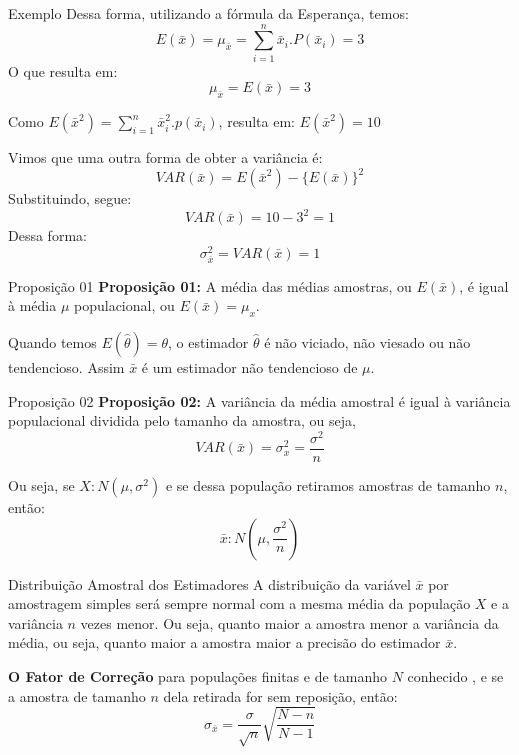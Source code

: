 \documentclass[hyperref={pdfpagelabels=false}]{beamer}
\begin{document}
\begin{frame}{Exemplo}
	Dessa forma, utilizando a fórmula da Esperança, temos: \pause
	$$E(\bar{x}) = \mu_{\bar{x}} = \displaystyle \sum_{i=1}^{n}\bar{x}_i . P(\bar{x}_i) = 3$$ \pause
	O que resulta em:
	$$\mu_{\bar{x}} = E(\bar{x}) = 3$$
	
	\pause
	Como $E(\bar{x}^2) = \displaystyle \sum_{i=1}^{n}\bar{x}_i^2 . p(\bar{x}_i)$, resulta em: $E(\bar{x}^2) =10$
	
	\pause
	Vimos que uma outra forma de obter a variância é: 
	$$VAR(\bar{x}) = E(\bar{x}^2) - \{E(\bar{x})\}^2$$
	\pause
	Substituindo, segue:
	$$VAR(\bar{x}) = 10 - 3^2 = 1$$
	\pause
	Dessa forma:
	$$\sigma_{\bar{x}}^2 = VAR(\bar{x})=1$$
\end{frame}

\begin{frame}{Proposição 01}
	\textbf{Proposição 01:}	A média das médias amostras, ou $E(\bar{x})$, é igual à média $\mu$ populacional, ou $E(\bar{x}) = \mu_x$.
	
	\pause
	Quando temos $E(\hat{\theta}) = \theta$, o estimador $\hat{\theta}$ é não viciado, não viesado ou não tendencioso. Assim $\bar{x}$ é um estimador não tendencioso de $\mu$.
\end{frame}

\begin{frame}{Proposição 02}
	\textbf{Proposição 02:}	A variância da média amostral é igual à variância populacional dividida pelo tamanho da amostra, ou seja,
	$$VAR(\bar{x}) = \sigma_x^2 = \displaystyle \frac{\sigma^2}{n}$$
	
	\pause
	Ou seja, se $X:N(\mu,\sigma^2)$ e se dessa população retiramos amostras de tamanho $n$, então:
	$$\bar{x}:N\left( \mu, \displaystyle \frac{\sigma^2}{n} \right)$$
\end{frame}


\begin{frame}{Distribuição Amostral dos Estimadores}
	A distribuição da variável $\bar{x}$ por amostragem simples será sempre normal com a mesma média da população $X$ e a variância $n$ vezes menor. Ou seja, quanto maior a amostra menor a variância da média, ou seja, quanto maior a amostra maior a precisão do estimador $\bar{x}$.
	
	\pause
	{\bf O Fator de Correção} para populações finitas e de tamanho $N$ conhecido , e se a amostra de tamanho $n$ dela retirada for sem reposição, então:
	$$\sigma_{\bar{x}} = \displaystyle \frac{\sigma}{\sqrt{n}}\sqrt{\frac{N - n}{N - 1}}$$
\end{frame}
\end{document}
